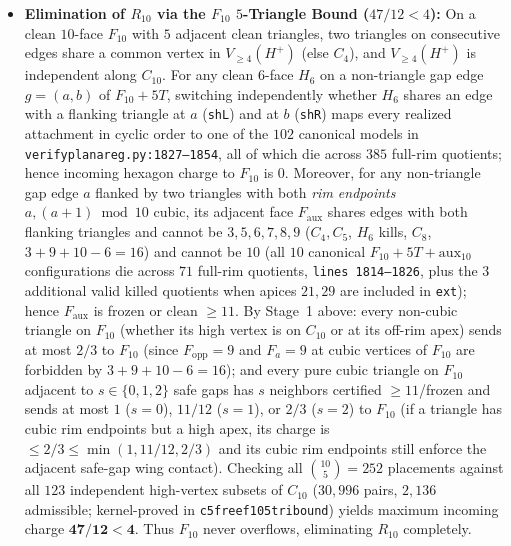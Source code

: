 \documentclass[11pt,reqno]{amsart}
\theoremstyle{plain}
\theoremstyle{definition}
\theoremstyle{remark}
\newcommand{\chf}{\mathrm{ch}_{\mathrm{fin}}}
\newcommand{\Vge}{V_{\ge 4}}
\DeclareRobustCommand{\_}{\ifmmode\text{\textunderscore}\else\textunderscore\allowbreak\fi}
\begin{document}
\begin{itemize}[leftmargin=1.8em]
\begin{enumerate}[label=(\arabic*),leftmargin=2.0em]
  \end{enumerate}
  Hence $H_1$ never sends charge to a clean $\{9, 11, 12\}$-face, certifying $w_{6o,\mathrm{nc}}(d) = 0$ for $d \in \{9, 11, 12\}$. On clean $d = 7$, $71$ cubic $3$-hex rim kills (\texttt{f7\_3h}) plus $31$ high-vertex $2$-hex kills (\texttt{f7\_pair\_k}; $102 = 71 + 31$ total $F_7$ kills) ensure at most $4$ charged $6$-faces touch $F_7$, so $\chf(F_7) \le -1 + 4 \cdot \frac{1}{4} = 0$. Reconciling all counts: $2{,}962 = 2{,}887\ (\text{v9}) + 4\ (\text{core vabs}) + 71\ (\text{cubic } F_7)$, and adding $47\ (\texttt{3-hex+2T}) + 71\ (\text{aux}_{10}) + 385\ (F_{10} H_6) + 31\ (F_7\text{-pair}) + 5\ (T_{\mathrm{frz}})$ gives $3{,}501$ total $C_5$-free kills (in Lean: $71 + 385 + 51 + 102 + 5 + 2{,}887 = 3{,}501$).

  \item \textbf{Elimination of $R_{10}$ via the $F_{10}$ $5$-Triangle Bound ($47/12 < 4$):} On a clean $10$-face $F_{10}$ with $5$ adjacent clean triangles, two triangles on consecutive edges share a common vertex in $\Vge(H^+)$ (else $C_4$), and $\Vge(H^+)$ is independent along $C_{10}$. For any clean $6$-face $H_6$ on a non-triangle gap edge $g = (a, b)$ of $F_{10} + 5T$, switching independently whether $H_6$ shares an edge with a flanking triangle at $a$ (\texttt{sh\_L}) and at $b$ (\texttt{sh\_R}) maps every realized attachment in cyclic order to one of the $102$ canonical models in \texttt{verify\_planar\_eg.py:1827--1854}, all of which die across $385$ full-rim quotients; hence incoming hexagon charge to $F_{10}$ is $0$. Moreover, for any non-triangle gap edge $a$ flanked by two triangles with both \emph{rim endpoints} $a, (a+1) \bmod 10$ cubic, its adjacent face $F_{\mathrm{aux}}$ shares edges with both flanking triangles and cannot be $3, 5, 6, 7, 8, 9$ ($C_4, C_5$, $H_6$ kills, $C_8$, $3+9+10-6=16$) and cannot be $10$ (all $10$ canonical $F_{10} + 5T + \mathrm{aux}_{10}$ configurations die across $71$ full-rim quotients, \texttt{lines 1814--1826}, plus the $3$ additional valid killed quotients when apices $21, 29$ are included in \texttt{ext}); hence $F_{\mathrm{aux}}$ is frozen or clean $\ge 11$. By Stage~1 above: every non-cubic triangle on $F_{10}$ (whether its high vertex is on $C_{10}$ or at its off-rim apex) sends at most $2/3$ to $F_{10}$ (since $F_{\mathrm{opp}} = 9$ and $F_a = 9$ at cubic vertices of $F_{10}$ are forbidden by $3+9+10-6=16$); and every pure cubic triangle on $F_{10}$ adjacent to $s \in \{0, 1, 2\}$ safe gaps has $s$ neighbors certified $\ge 11$/frozen and sends at most $1$ ($s=0$), $11/12$ ($s=1$), or $2/3$ ($s=2$) to $F_{10}$ (if a triangle has cubic rim endpoints but a high apex, its charge is $\le 2/3 \le \min(1, 11/12, 2/3)$ and its cubic rim endpoints still enforce the adjacent safe-gap wing contact). Checking all $\binom{10}{5} = 252$ placements against all $123$ independent high-vertex subsets of $C_{10}$ ($30{,}996$ pairs, $2{,}136$ admissible; kernel-proved in \texttt{c5free\_f10\_5tri\_bound}) yields maximum incoming charge $\mathbf{47/12 < 4}$. Thus $F_{10}$ never overflows, eliminating $R_{10}$ completely.


\end{itemize}
\end{document}
